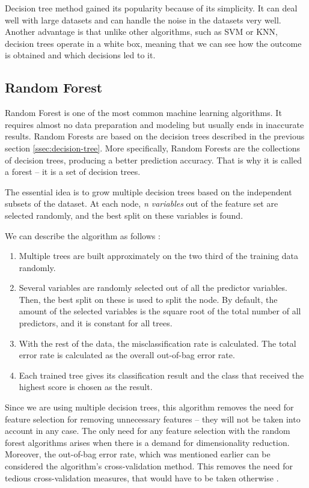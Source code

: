 Decision tree method gained its popularity because of its simplicity. It can deal well with large datasets and can handle the noise in the datasets very well. Another advantage is that unlike other algorithms, such as SVM or KNN, decision trees operate in a white box, meaning that we can see how the outcome is obtained and which decisions led to it.

\subsection{Random Forest}
\label{ssec:random-forest}

Random Forest is one of the most common machine learning algorithms. It requires almost no data preparation and modeling but usually ends in inaccurate results. Random Forests are based on the decision trees described in the previous section \ref{ssec:decision-tree}. More specifically, Random Forests are the collections of decision trees, producing a better prediction accuracy. That is why it is called a forest – it is a set of decision trees.

The essential idea is to grow multiple decision trees based on the independent subsets of the dataset. At each node, \textit{n variables} out of the feature set are selected randomly, and the best split on these variables is found.


We can describe the algorithm as follows \cite{biau2012analysis}:

\begin{enumerate}
\item Multiple trees are built approximately on the two third of the training data randomly.
\item Several variables are randomly selected out of all the predictor variables. Then, the best split on these is used to split the node. By default, the amount of the selected variables is the square root of the total number of all predictors, and it is constant for all trees.
\item With the rest of the data, the misclassification rate is calculated. The total error rate is calculated as the overall out-of-bag error rate.
\item Each trained tree gives its classification result and the class that received the highest score is chosen as the result.
\end{enumerate}

Since we are using multiple decision trees, this algorithm removes the need for feature selection for removing unnecessary features – they will not be taken into account in any case. The only need for any feature selection with the random forest algorithms arises when there is a demand for dimensionality reduction. Moreover, the out-of-bag error rate, which was mentioned earlier can be considered the algorithm’s cross-validation method. This removes the need for tedious cross-validation measures, that would have to be taken otherwise \cite{mitchell1997machine}.

